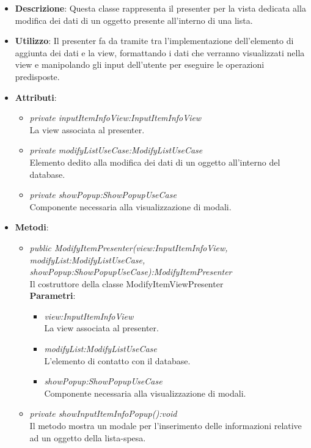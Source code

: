 \begin{itemize}
\item \textbf{Descrizione}: Questa classe rappresenta il presenter per la vista dedicata alla modifica dei dati di un oggetto presente all'interno di una lista.
\item \textbf{Utilizzo}: Il presenter fa da tramite tra l'implementazione dell'elemento di aggiunta dei dati e la view, formattando i dati che verranno visualizzati nella view e manipolando gli input dell'utente per eseguire le operazioni predisposte.
\item \textbf{Attributi}: 
	\begin{itemize}
	\item \textit{private inputItemInfoView:InputItemInfoView}\\
	La view associata al presenter.
	\item \textit{private modifyListUseCase:ModifyListUseCase}\\
	Elemento dedito alla modifica dei dati di un oggetto all'interno del database.
	\item \textit{private showPopup:ShowPopupUseCase}\\
	Componente necessaria alla visualizzazione di modali.
	\end{itemize}
\item \textbf{Metodi}:
	\begin{itemize}
	\item \textit{public ModifyItemPresenter(view:InputItemInfoView, modifyList:ModifyListUseCase, \\ showPopup:ShowPopupUseCase):ModifyItemPresenter}\\
	Il costruttore della classe ModifyItemViewPresenter
		\\ \textbf{Parametri}: \begin{itemize}
		\item \textit{view:InputItemInfoView}\\
		La view associata al presenter.
		\item \textit{modifyList:ModifyListUseCase}\\
		L'elemento di contatto con il database.
		\item \textit{showPopup:ShowPopupUseCase}\\
		Componente necessaria alla visualizzazione di modali.
		\end{itemize} 
	\item \textit{private showInputItemInfoPopup():void}\\
	Il metodo mostra un modale per l'inserimento delle informazioni relative ad un oggetto della lista-spesa.

\end{itemize}
\end{itemize}

